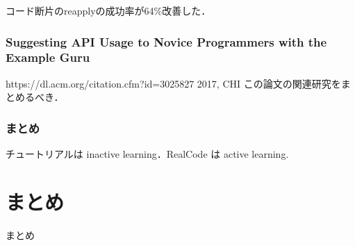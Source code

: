 コード断片のreapplyの成功率が64\%改善した．

\subsubsection*{Suggesting API Usage to Novice Programmers with the Example Guru}
https://dl.acm.org/citation.cfm?id=3025827
2017, CHI
この論文の関連研究をまとめるべき．


\subsubsection{まとめ}

チュートリアルは inactive learning．RealCode は active learning.



\section{まとめ}
まとめ

